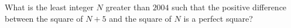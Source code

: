 What is the least integer $N$ greater than $2004$ such that the positive difference between the square of $N+5$ and the square of $N$ is a perfect square?
